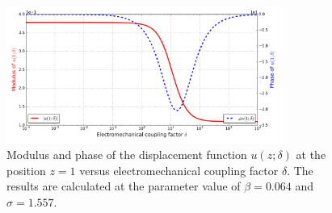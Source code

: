 \documentclass{article}
\begin{document}
\begin{figure}[!htbp]
    \centering
    \includegraphics[width=0.8\textwidth]{./img_eig_asy/fig_sol_analytic_disp_end.jpg}
    \caption{Modulus and phase of the displacement function $u(z;\delta)$ at the position $z=1$ versus electromechanical coupling factor $\delta$. The results are calculated at the parameter value of $\beta = 0.064$ and $\sigma = 1.557$.}
    \label{fig:fig_sol_analytic_disp_end}
\end{figure}
\end{document}
